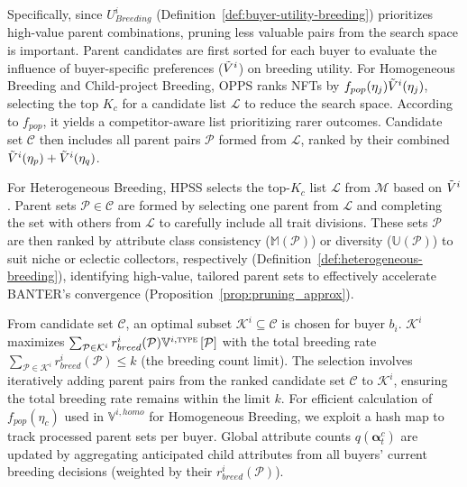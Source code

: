 \documentclass[conference]{IEEEtran}
\theoremstyle{plain}
\begin{document}
    Specifically, since $U^i_\textit{Breeding}$ (Definition~\ref{def:buyer-utility-breeding}) prioritizes high-value parent combinations, pruning less valuable pairs from the search space is important. Parent candidates are first sorted for each buyer to evaluate the influence of buyer-specific preferences ($\Tilde{V}^i$) on breeding utility. For Homogeneous Breeding\xspace and Child-project Breeding\xspace, OPPS\xspace ranks NFTs by $f_{pop}(\eta_j)\Tilde{V}^i(\eta_j)$, selecting the top $K_c$ for a candidate list $\mathcal{L}$ to reduce the search space. According to $f_{pop}$, it yields a competitor-aware list prioritizing rarer outcomes. Candidate set $\mathcal{C}$ then includes all parent pairs $\mathcal{P}$ formed from $\mathcal{L}$, ranked by their combined $\Tilde{V}^i(\eta_p) + \Tilde{V}^i(\eta_q)$.

    For Heterogeneous Breeding\xspace, HPSS\xspace selects the top-$K_c$ list $\mathcal{L}$ from $\mathcal{M}$ based on $\Tilde{V}^i$. Parent sets $\mathcal{P} \in \mathcal{C}$ are formed by selecting one parent from $\mathcal{L}$ and completing the set with others from $\mathcal{L}$ to carefully include all trait divisions. These sets $\mathcal{P}$ are then ranked by attribute class consistency ($\mathbb{M}(\mathcal{P})$) or diversity ($\mathbb{U}(\mathcal{P})$) to suit niche or eclectic collectors, respectively (Definition~\ref{def:heterogeneous-breeding}), identifying high-value, tailored parent sets to effectively accelerate BANTER\xspace's convergence (Proposition~\ref{prop:pruning_approx}).

    From candidate set $\mathcal{C}$, an optimal subset $\mathcal{K}^i \subseteq \mathcal{C}$ is chosen for buyer $b_i$. $\mathcal{K}^i$ maximizes $\sum_{\mathcal{P}\in \mathcal{K}^i} r_{breed}^i(\mathcal{P})\mathbb{V}^{i, \textsc{type}}\left[\mathcal{P}\right]$ with the total breeding rate $\sum_{\mathcal{P}\in \mathcal{K}^i}r_{breed}^i(\mathcal{P}) \leq k$ (the breeding count limit). The selection involves iteratively adding parent pairs from the ranked candidate set $\mathcal{C}$ to $\mathcal{K}^i$, ensuring the total breeding rate remains within the limit $k$. For efficient calculation of $f_{pop}(\eta_c)$ used in $\mathbb{V}^{i, homo}$ for Homogeneous Breeding\xspace {}, we exploit a hash map to track processed parent sets per buyer. Global attribute counts $q(\bm{\alpha}^c_t)$ are updated by aggregating anticipated child attributes from all buyers' current breeding decisions (weighted by their $r_{breed}^i(\mathcal{P})$).
\end{document}
